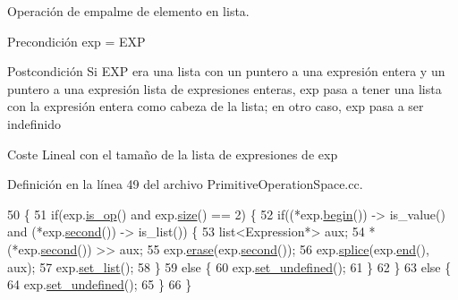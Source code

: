 Operación de empalme de elemento en lista. 

\begin{DoxyPrecond}{Precondición}
\textquotesingle{}exp\textquotesingle{} = \textquotesingle{}E\+XP\textquotesingle{} 
\end{DoxyPrecond}
\begin{DoxyPostcond}{Postcondición}
Si \textquotesingle{}E\+XP\textquotesingle{} era una lista con un puntero a una expresión entera y un puntero a una expresión lista de expresiones enteras, \textquotesingle{}exp\textquotesingle{} pasa a tener una lista con la expresión entera como cabeza de la lista; en otro caso, \textquotesingle{}exp\textquotesingle{} pasa a ser indefinido 
\end{DoxyPostcond}
\begin{DoxyParagraph}{Coste}
Lineal con el tamaño de la lista de expresiones de \textquotesingle{}exp\textquotesingle{} 
\end{DoxyParagraph}


Definición en la línea 49 del archivo Primitive\+Operation\+Space.\+cc.


\begin{DoxyCode}
50 \{
51   \textcolor{keywordflow}{if}(exp.\hyperlink{class_expression_a422fb496720b177eaed37a9694613384}{is\_op}() and exp.\hyperlink{class_expression_a0e8980139631cf7bc9fd3bca9d8caddc}{size}() == 2) \{
52     \textcolor{keywordflow}{if}((*exp.\hyperlink{class_expression_a0ed7767d72f93c9121bb73afead5782a}{begin}()) -> is\_value() and (*exp.\hyperlink{class_expression_ae53f7febf676d564d6393bf2762fc08e}{second}()) -> is\_list()) \{
53       list<Expression*> aux;
54       *(*exp.\hyperlink{class_expression_ae53f7febf676d564d6393bf2762fc08e}{second}()) >> aux;
55       exp.\hyperlink{class_expression_a3fcf4ce4c5efde7795a6b3b004abf0ad}{erase}(exp.\hyperlink{class_expression_ae53f7febf676d564d6393bf2762fc08e}{second}());
56       exp.\hyperlink{class_expression_afcd885fc3562809ede2796b722bb4854}{splice}(exp.\hyperlink{class_expression_af5229aaf6bbb7200db55f220f315192e}{end}(), aux);
57       exp.\hyperlink{class_expression_a66db516be4fa87d58df4806938676508}{set\_list}();
58     \}
59     \textcolor{keywordflow}{else} \{
60       exp.\hyperlink{class_expression_a1d3ddfe83d20f47930792807e8b22248}{set\_undefined}();
61     \}
62   \}
63   \textcolor{keywordflow}{else} \{
64     exp.\hyperlink{class_expression_a1d3ddfe83d20f47930792807e8b22248}{set\_undefined}();
65   \}
66 \}
\end{DoxyCode}
